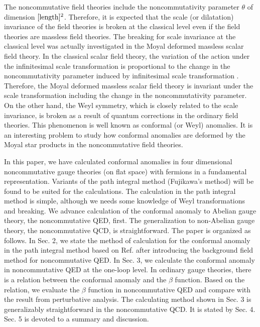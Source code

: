 \documentclass[a4paper,12pt]{article}
\begin{document}
The noncommutative field theories include the noncommutativity parameter 
$\theta$ of dimension $[{\rm length}]^{2}$. Therefore, it is expected that 
the scale (or dilatation) invariance of the field theories is broken at the 
classical level even if the field theories are massless field theories. The 
breaking for scale invariance at the classical level was actually 
investigated in the Moyal deformed massless scalar field theory. 
In the classical scalar field theory, 
the variation of the action under the infinitesimal scale 
transformation is proportional to the change in the noncommutativity 
parameter induced by infinitesimal scale transformation \cite{AGJGHGLPMSRW}. 
Therefore, the Moyal deformed massless scalar field theory is invariant 
under the scale transformation including the change in the noncommutativity 
parameter. 
On the other hand, the Weyl symmetry, which is closely related to the scale 
invariance, is broken as a result of quantum corrections in the ordinary field 
theories. This phenomenon is well known as 
conformal (or Weyl) anomalies. It is an interesting problem to study how 
conformal anomalies are deformed by the Moyal star products in the 
noncommutative field theories. 


In this paper, we have calculated conformal 
anomalies in four dimensional noncommutative gauge theories (on flat space) 
with fermions in a fundamental representation. Variants of 
the path integral method (Fujikawa's method) will be found to be 
suited for the calculations. The calculation in the path integral method is 
simple, although we needs some knowledge of Weyl 
transformations and breaking. 
We advance calculation of the conformal anomaly to Abelian gauge theory, 
the noncommutative QED, first. The generalization to 
non-Abelian gauge theory, the noncommutative 
QCD, is straightforward. The paper is organized as follows. 
In Sec. 2, we state the method of calculation for the conformal 
anomaly in the path integral method based on Ref. \cite{KF} after 
introducing the background field method for noncommutative QED. In Sec. 3, we 
calculate the conformal anomaly in noncommutative QED at the one-loop level. 
In ordinary gauge theories, 
there is a relation between the conformal anomaly and the $\beta$ function. 
Based on the relation, we evaluate the $\beta$ function in noncommutative 
QED and compare with the result from perturbative analysis. 
The calculating method shown in Sec. 3 is generalizably 
straightforward in the noncommutative QCD. It is stated by Sec. 4. 
Sec. 5 is devoted to a summary and discussion. 
\end{document}
